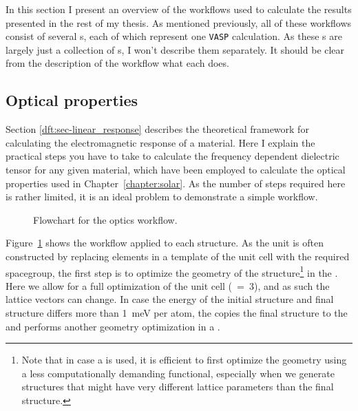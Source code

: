 \begin{refsection}
In this section I present an overview of the workflows used to calculate the 
results presented in the rest of my thesis. As mentioned previously, all of 
these workflows consist of several s, each of which represent 
one \texttt{VASP} calculation. As these s are largely just a 
collection of s, I won't describe them separately. It should be 
clear from the description of the workflow what each  does. 
 
\subsection{Optical properties} \label{automation:sec-optics} 
 
Section \ref{dft:sec-linear_response} describes the theoretical framework for 
calculating the electromagnetic response of a material. Here I explain the 
practical steps you have to take to calculate the frequency dependent 
dielectric tensor for any given material, which have been employed to 
calculate the optical properties used in Chapter~\ref{chapter:solar}. As the 
number of steps required here is rather limited, it is an ideal problem to 
demonstrate a simple workflow. 
 
\begin{figure}[ht] 
 
\caption{\label{automation:fig-optics} Flowchart for the optics workflow.} 
\end{figure} 
 
Figure~\ref{automation:fig-optics} shows the workflow applied to each 
structure. As the unit is often constructed by replacing elements in a 
template of the unit cell with the required spacegroup, the first step is to 
optimize the geometry of the structure\footnote{Note that in case a 
 is used, it is efficient to first 
optimize the geometry using a less computationally demanding functional, 
especially when we generate structures that might have very different lattice 
parameters than the final structure.} in the . Here we allow 
for a full optimization of the unit cell (~=~3), and as such the 
lattice vectors can change. In case the energy of the initial structure and 
final structure differs more than 1~\si{\milli\electronvolt} per atom, the 
 copies the final structure 
 to the  and performs another geometry optimization 
in a . 
 

\end{refsection}
